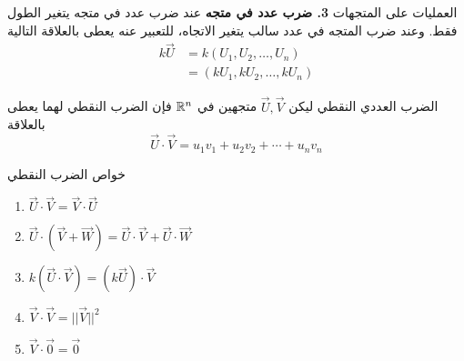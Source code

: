 \begin{frame}
	\begin{exampleblock}{العمليات على المتجهات}
		\textbf{3. ضرب عدد في متجه}
		عند ضرب عدد في متجه يتغير الطول فقط. وعند ضرب المتجه في عدد سالب يتغير الاتجاه، للتعبير عنه يعطى بالعلاقة التالية
		\begin{align*}
			k \vec{U} &= k(U_1, U_2, \dots, U_n)\\
			&= (kU_1, kU_2, \dots, kU_n)
		\end{align*}
	\end{exampleblock}
\end{frame}

\begin{frame}
	
	\pause
	\begin{exampleblock}{الضرب العددي النقطي}
		ليكن $\vec{U}, \vec{V}$ متجهين في $\mathbb{R}^n$ فإن الضرب النقطي لهما يعطى بالعلاقة 
		\[
		\vec{U} \cdot \vec{V} = u_1v_1 + u_2v_2 + \cdots + u_nv_n
		\]
	\end{exampleblock}
	
	\pause
	\begin{exampleblock}{خواص الضرب النقطي}
		\begin{english}
			\begin{enumerate}
				\item $\vec{U}\cdot\vec{V}=\vec{V}\cdot\vec{U}$
				\item $\vec{U}\cdot(\vec{V}+\vec{W}) = \vec{U}\cdot\vec{V} + \vec{U}\cdot\vec{W}$
				\item $k(\vec{U}\cdot\vec{V}) = (k\vec{U})\cdot\vec{V}$
				\item $\vec{V}\cdot\vec{V} = ||\vec{V}||^2$
				\item $\vec{V}\cdot \vec{0} = \vec{0}$
			\end{enumerate}
		\end{english}
	\end{exampleblock}
\end{frame}

